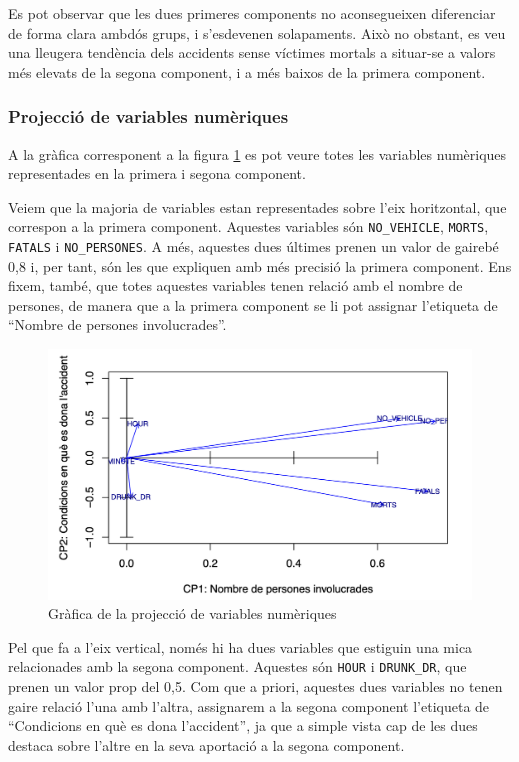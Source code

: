 \documentclass[12pt,longbibliography]{article}
\theoremstyle{definition}
\theoremstyle{remark}
\begin{document}
Es pot observar que les dues primeres components no aconsegueixen diferenciar de forma clara ambdós grups, i s'esdevenen solapaments. Això no obstant, es veu una lleugera tendència dels accidents sense víctimes mortals a situar-se a valors més elevats de la segona component, i a més baixos de la primera component. 

\subsubsection{Projecció de variables numèriques}

A la gràfica corresponent a la figura \ref{fig:ACP4} es pot veure totes les variables numèriques representades en la primera i segona component.


Veiem que la majoria de variables estan representades sobre l’eix horitzontal, que correspon a la primera component. Aquestes variables són \texttt{NO\_VEHICLE}, \texttt{MORTS}, \texttt{FATALS} i \texttt{NO\_PERSONES}. A més, aquestes dues últimes prenen un valor de gairebé 0,8 i, per tant, són les que expliquen amb més precisió la primera component. Ens fixem, també, que totes aquestes variables tenen relació amb el nombre de persones, de manera que a la primera component se li pot assignar l’etiqueta de ``Nombre de persones involucrades''.

\begin{figure}[H]
\begin{center}
\includegraphics[width=12cm]{acp4}
\end{center}
\caption{Gràfica de la projecció de variables numèriques}
\label{fig:ACP4}
\end{figure}


Pel que fa a l’eix vertical, només hi ha dues variables que estiguin una mica relacionades amb la segona component. Aquestes són \texttt{HOUR} i \texttt{DRUNK\_DR}, que prenen un valor prop del 0,5. Com que a priori, aquestes dues variables no tenen gaire relació l'una amb l'altra, assignarem a la segona component l'etiqueta de ``Condicions en què es dona l'accident'', ja que a simple vista cap de les dues destaca sobre l'altre en la seva aportació a la segona component.
\end{document}
